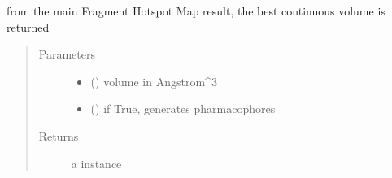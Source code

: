 \documentclass[letterpaper,10pt,english]{sphinxmanual}
\begin{document}
\begin{fulllineitems}
\begin{fulllineitems}
\label{\detokenize{result_api:hotspots.result.Extractor.extract_best_volume}}
from the main Fragment Hotspot Map result, the best continuous volume is returned
\begin{quote}\begin{description}
\item[{Parameters}] \leavevmode\begin{itemize}
\item {} 
 () \textendash{} volume in Angstrom\textasciicircum{}3

\item {} 
 () \textendash{} if True, generates pharmacophores

\end{itemize}

\item[{Returns}] \leavevmode
a  instance

\end{description}\end{quote}

\begin{sphinxVerbatim}[commandchars=\\\{\}]
\end{sphinxVerbatim}

\begin{sphinxVerbatim}[commandchars=\\\{\}]
   
\end{sphinxVerbatim}

\begin{sphinxVerbatim}[commandchars=\\\{\}]
  
  
\end{sphinxVerbatim}

\end{fulllineitems}


\end{fulllineitems}
\end{document}
